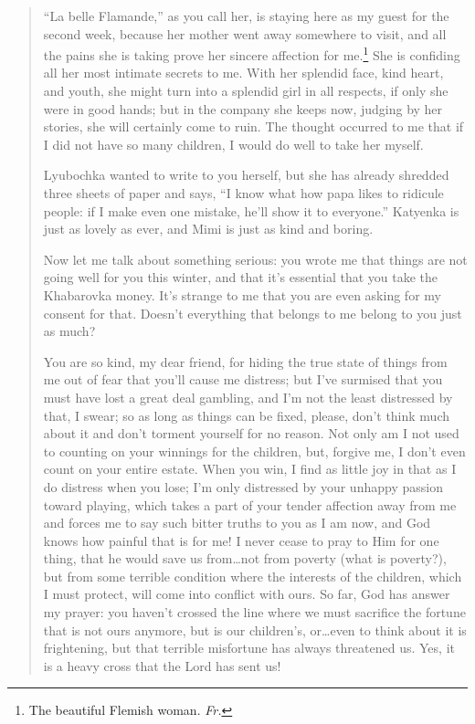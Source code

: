 \begin{quotation}
``La belle Flamande,'' as you call her, is staying here as my guest for the second week, because her mother went away somewhere to visit, and all the pains she is taking prove her sincere affection for me.\footnote{The beautiful Flemish woman. \textit{Fr.}} She is confiding all her most intimate secrets to me. With her splendid face, kind heart, and youth, she might turn into a splendid girl in all respects, if only she were in good hands; but in the company she keeps now, judging by her stories, she will certainly come to ruin. The thought occurred to me that if I did not have so many children, I would do well to take her myself.

Lyubochka wanted to write to you herself, but she has already shredded three sheets of paper and says, ``I know what how papa likes to ridicule people: if I make even one mistake, he'll show it to everyone.'' Katyenka is just as lovely as ever, and Mimi is just as kind and boring.

Now let me talk about something serious: you wrote me that things are not going well for you this winter, and that it's essential that you take the Khabarovka money. It's strange to me that you are even asking for my consent for that. Doesn't everything that belongs to me belong to you just as much?

You are so kind, my dear friend, for hiding the true state of things from me out of fear that you'll cause me distress; but I've surmised that you must have lost a great deal gambling, and I'm not the least distressed by that, I swear; so as long as things can be fixed, please, don't think much about it and don't torment yourself for no reason. Not only am I not used to counting on your winnings for the children, but, forgive me, I don't even count on your entire estate. When you win, I find as little joy in that as I do distress when you lose; I'm only distressed by your unhappy passion toward playing, which takes a part of your tender affection away from me and forces me to say such bitter truths to you as I am now, and God knows how painful that is for me! I never cease to pray to Him for one thing, that he would save us from\ldots{}not from poverty (what is poverty?), but from some terrible condition where the interests of the children, which I must protect, will come into conflict with ours. So far, God has answer my prayer: you haven't crossed the line where we must sacrifice the fortune that is not ours anymore, but is our children's, or\ldots{}even to think about it is frightening, but that terrible misfortune has always threatened us. Yes, it is a heavy cross that the Lord has sent us!


\end{quotation}
